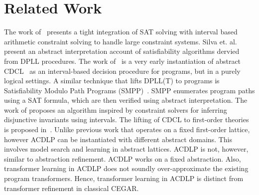 \section{Related Work}
%
The work of~\cite{franzle} presents a tight integration of SAT solving
with interval based arithmetic constraint solving to handle large constraint
systems. 
%
Silva et. al.~\cite{sas12} present an abstract interpretation account of 
satisfiability algorithms dervied from DPLL procedures.  
%
The work of~\cite{tacas12} is a very early instantiation of abstract 
CDCL~\cite{sas12} as an interval-based decision procedure for programs, 
but in a purely logical settings.  
%
A similar technique that lifts DPLL(T) to programs is Satisfiability Modulo 
Path Programs (SMPP)~\cite{SMPP}. SMPP enumerates program paths using a SAT 
formula, which are then verified using abstract interpretation.  
%
The work of \cite{DBLP:conf/esop/MineBR16} proposes an algorithm inspired by 
constraint solvers for inferring disjunctive invariants using intervals.
%
The lifting of CDCL to first-order theories is proposed in~\cite{dpll,cp09,ndsmt}.
%
  Unlike previous work that operates on a fixed first-order lattice, however 
  ACDLP can be instantiated with different abstract domains.  This
  involves model search and learning in abstract lattices. ACDLP is not, however,
  similar to abstraction refinement. ACDLP works on a fixed
  abstraction. Also, transformer learning in ACDLP does not soundly over-approximate
  the existing program transformers. Hence, transformer learning in ACDLP is
  distinct from transformer refinement in classical CEGAR. 

%
%
%
%


